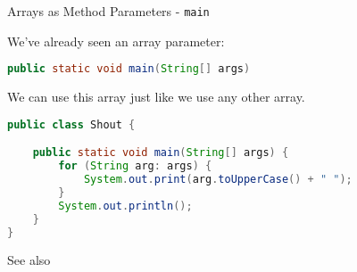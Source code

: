 \documentclass{beamer}
\begin{document}
\begin{frame}[fragile]{Arrays as Method Parameters - {\tt main}}


We've already seen an array parameter:
\begin{lstlisting}[language=Java]
public static void main(String[] args)
\end{lstlisting}

We can use this array just like we use any other array.
\begin{lstlisting}[language=Java]
public class Shout {

    public static void main(String[] args) {
        for (String arg: args) {
            System.out.print(arg.toUpperCase() + " ");
        }
        System.out.println();
    }
}
\end{lstlisting}
See also 
\end{frame}





\end{document}
